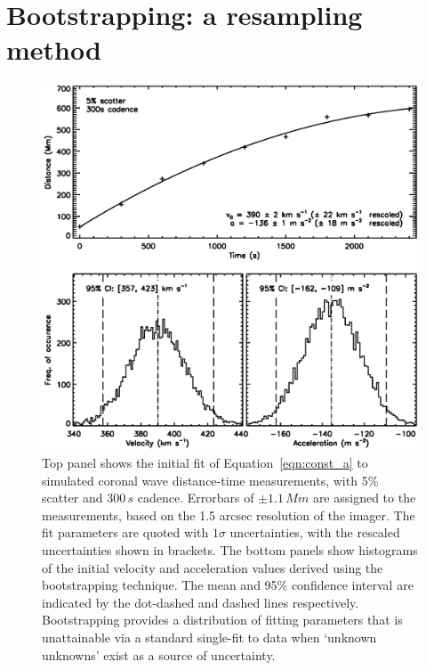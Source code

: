 \documentclass[structabstract]{aa}
\begin{document}
\section{Bootstrapping: a resampling method}
\label{sect:bootstrapping}

\begin{figure}
\begin{center}
\includegraphics[scale=0.45, trim=20 50 0 0, clip=true]{images/cad_boot_weight_jpb.eps}
\caption{Top panel shows the initial fit of Equation~\ref{eqn:const_a} to simulated coronal wave distance-time measurements, with 5\% scatter and $300\,s$ cadence. Errorbars of $\pm1.1\,Mm$ are assigned to the measurements, based on the 1.5 arcsec resolution of the imager. The fit parameters are quoted with $1\sigma$ uncertainties, with the rescaled uncertainties shown in brackets. The bottom panels show histograms of the initial velocity and acceleration values derived using the bootstrapping technique. The mean and 95\% confidence interval are indicated by the dot-dashed and dashed lines respectively. Bootstrapping provides a distribution of fitting parameters that is unattainable via a standard single-fit to data when `unknown unknowns' exist as a source of uncertainty.}
\label{cad_boot_weight}
\end{center}
\end{figure}
\end{document}

